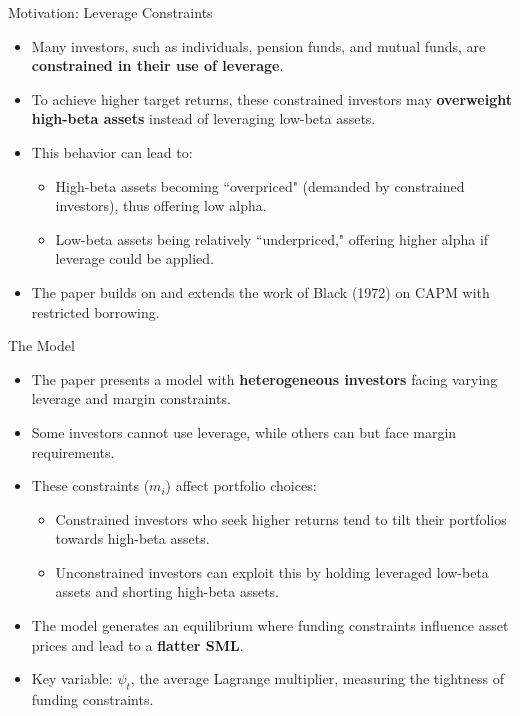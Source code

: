 \documentclass[10pt]{beamer}
\begin{document}
\begin{frame}{Motivation: Leverage Constraints}
  \begin{itemize}
    \item Many investors, such as individuals, pension funds, and mutual funds, are \textbf{constrained in their use of leverage}.
    \item To achieve higher target returns, these constrained investors may \textbf{overweight high-beta assets} instead of leveraging low-beta assets.
    \item This behavior can lead to:
        \begin{itemize}
            \item High-beta assets becoming ``overpriced" (demanded by constrained investors), thus offering low alpha.
            \item Low-beta assets being relatively ``underpriced," offering higher alpha if leverage could be applied.
        \end{itemize}
    \item The paper builds on and extends the work of Black (1972) on CAPM with restricted borrowing.
  \end{itemize}
\end{frame}

\begin{frame}{The Model}
  \begin{itemize}
    \item The paper presents a model with \textbf{heterogeneous investors} facing varying leverage and margin constraints.
    \item Some investors cannot use leverage, while others can but face margin requirements.
    \item These constraints ($m_i$) affect portfolio choices:
        \begin{itemize}
            \item Constrained investors who seek higher returns tend to tilt their portfolios towards high-beta assets.
            \item Unconstrained investors can exploit this by holding leveraged low-beta assets and shorting high-beta assets.
        \end{itemize}
    \item The model generates an equilibrium where funding constraints influence asset prices and lead to a \textbf{flatter SML}.
    \item Key variable: $\psi_t$, the average Lagrange multiplier, measuring the tightness of funding constraints.
  \end{itemize}
\end{frame}
\end{document}
